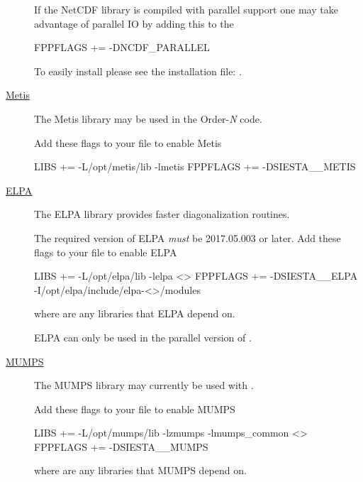 \begin{description}
  
  If the NetCDF library is compiled with parallel support one may
  take advantage of parallel IO by adding this to the  
\begin{shellexample}
  FPPFLAGS += -DNCDF_PARALLEL
\end{shellexample}

  To easily install  please see the installation file:
  .


  \item[\href{http://glaros.dtc.umn.edu/gkhome/metis/metis/overview}{Metis}]%
  The Metis library may be used in the Order-\emph N code. 

  Add these flags to your  file to enable Metis
\begin{shellexample}
  LIBS += -L/opt/metis/lib -lmetis
  FPPFLAGS += -DSIESTA__METIS
\end{shellexample}

  
  \item[\href{http://elpa.mpcdf.mpg.de}{ELPA}]%
  The ELPA\cite{ELPA,ELPA-1} library provides faster diagonalization routines.

  The required version of ELPA \emph{must} be 2017.05.003 or later.
  Add these flags to your  file to enable ELPA
\begin{shellexample}
  LIBS += -L/opt/elpa/lib -lelpa <>
  FPPFLAGS += -DSIESTA__ELPA -I/opt/elpa/include/elpa-<>/modules
\end{shellexample}
  where \shell{<>} are any libraries that ELPA depend on.

  \note ELPA can only be used in the parallel version of \siesta.

  
  \item[\href{http://mumps.enseeiht.fr}{MUMPS}]%
  The MUMPS library may currently be used with \tsiesta.
  
  Add these flags to your  file to enable MUMPS
\begin{shellexample}
  LIBS += -L/opt/mumps/lib -lzmumps -lmumps_common <>
  FPPFLAGS += -DSIESTA__MUMPS
\end{shellexample}
  where \shell{<>} are any libraries that MUMPS depend on.



\end{description}
